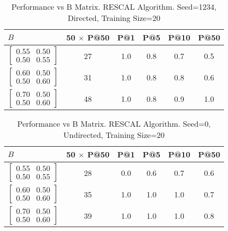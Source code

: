 \documentclass{tufte-handout}
\begin{document}
\begin{table}[htbp]
  \begin{tabular}{l c c c c c}
    $B$ & 50 $\times$ P@50 & P@1 & P@5 & P@10 & P@50 \\ \toprule
  $\begin{bmatrix} 0.55 & 0.50 \\0.50 &0.55 \end{bmatrix}$ & 27 & 1.0 & 0.8 & 0.7 & 0.5 \\
  $\begin{bmatrix} 0.60 & 0.50 \\0.50 &0.60 \end{bmatrix}$ & 31 & 1.0 & 0.8 & 0.8 & 0.6 \\
  $\begin{bmatrix} 0.70 & 0.50 \\0.50 &0.60 \end{bmatrix}$ & 48 & 1.0 & 0.8 & 0.9 & 1.0 \\
  \end{tabular}
  \caption{Performance vs B Matrix. RESCAL Algorithm. Seed=1234, Directed, Training Size=20}
  \label{tab:perf-vs-b}
\end{table}

\begin{table}[htbp]
  \begin{tabular}{l c c c c c}
    $B$ & 50 $\times$ P@50 & P@1 & P@5 & P@10 & P@50 \\ \toprule
  $\begin{bmatrix} 0.55 & 0.50 \\0.50 &0.55 \end{bmatrix}$ & 28 & 0.0 & 0.6 & 0.7 & 0.6 \\
  $\begin{bmatrix} 0.60 & 0.50 \\0.50 &0.60 \end{bmatrix}$ & 35 & 1.0 & 1.0 & 1.0 & 0.7 \\
  $\begin{bmatrix} 0.70 & 0.50 \\0.50 &0.60 \end{bmatrix}$ & 39 & 1.0 & 1.0 & 1.0 & 0.8 \\
  \end{tabular}
  \caption{Performance vs B Matrix. RESCAL Algorithm. Seed=0, Undirected, Training Size=20}
  \label{tab:perf-vs-b}
\end{table}
\end{document}
